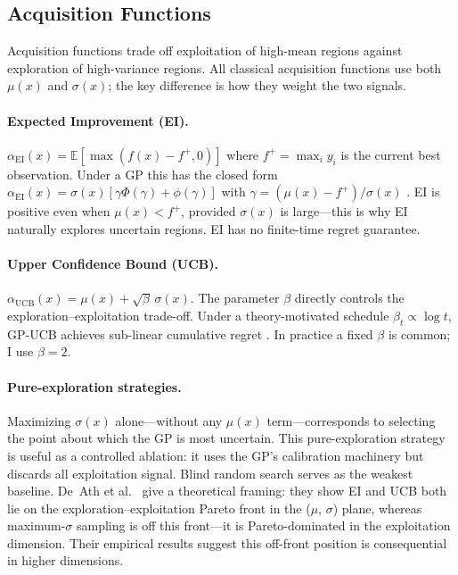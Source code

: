 \subsection{Acquisition Functions}
\label{sec:acq-background}

Acquisition functions trade off exploitation of high-mean regions
against exploration of high-variance regions.
All classical acquisition functions use both $\mu(x)$ and $\sigma(x)$;
the key difference is how they weight the two signals.

\paragraph{Expected Improvement (EI).}
$\alpha_{\mathrm{EI}}(x) = \mathbb{E}[\max(f(x) - f^+, 0)]$ where
$f^+ = \max_i y_i$ is the current best observation.
Under a GP this has the closed form
$\alpha_{\mathrm{EI}}(x) = \sigma(x)[\gamma\Phi(\gamma) + \phi(\gamma)]$
with $\gamma = (\mu(x) - f^+)/\sigma(x)$ \citep{frazier2018tutorial}.
EI is positive even when $\mu(x) < f^+$, provided $\sigma(x)$ is
large—this is why EI naturally explores uncertain regions.
EI has no finite-time regret guarantee.

\paragraph{Upper Confidence Bound (UCB).}
$\alpha_{\mathrm{UCB}}(x) = \mu(x) + \sqrt{\beta}\,\sigma(x)$.
The parameter $\beta$ directly controls the exploration–exploitation
trade-off.
Under a theory-motivated schedule $\beta_t \propto \log t$, GP-UCB
achieves sub-linear cumulative regret \citep{frazier2018tutorial}.
In practice a fixed $\beta$ is common; I use $\beta = 2$.

\paragraph{Pure-exploration strategies.}
Maximizing $\sigma(x)$ alone—without any $\mu(x)$ term—corresponds to
selecting the point about which the GP is most uncertain.
This pure-exploration strategy is useful as a controlled ablation: it
uses the GP's calibration machinery but discards all exploitation signal.
Blind random search serves as the weakest baseline.
De~Ath et al.~\citeyear{deAth2019greed} give a theoretical framing:
they show EI and UCB both lie on the exploration–exploitation Pareto
front in the ($\mu$, $\sigma$) plane, whereas maximum-$\sigma$ sampling
is off this front—it is Pareto-dominated in the exploitation dimension.
Their empirical results suggest this off-front position is
consequential in higher dimensions.

